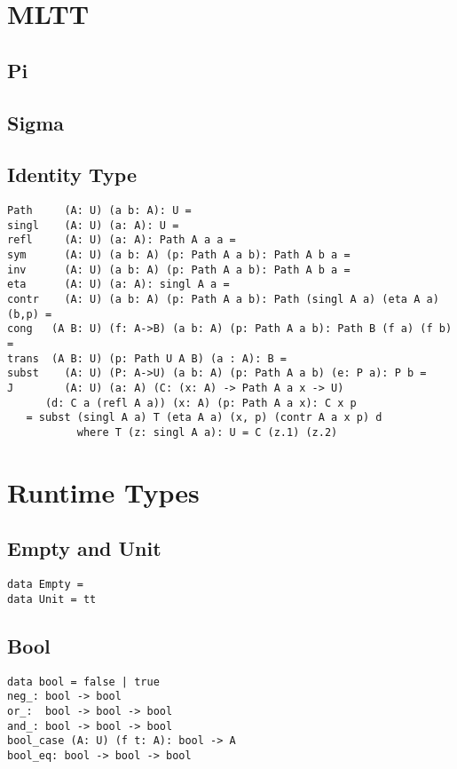 \documentclass{article}
\begin{document}
\section{MLTT}

\subsection{Pi}
\subsection{Sigma}
\subsection{Identity Type}

\begin{lstlisting}[mathescape=true]
Path     (A: U) (a b: A): U =
singl    (A: U) (a: A): U =
refl     (A: U) (a: A): Path A a a =
sym      (A: U) (a b: A) (p: Path A a b): Path A b a =
inv      (A: U) (a b: A) (p: Path A a b): Path A b a =
eta      (A: U) (a: A): singl A a =
contr    (A: U) (a b: A) (p: Path A a b): Path (singl A a) (eta A a) (b,p) =
cong   (A B: U) (f: A->B) (a b: A) (p: Path A a b): Path B (f a) (f b) =
trans  (A B: U) (p: Path U A B) (a : A): B =
subst    (A: U) (P: A->U) (a b: A) (p: Path A a b) (e: P a): P b =
J        (A: U) (a: A) (C: (x: A) -> Path A a x -> U)
      (d: C a (refl A a)) (x: A) (p: Path A a x): C x p
   = subst (singl A a) T (eta A a) (x, p) (contr A a x p) d
           where T (z: singl A a): U = C (z.1) (z.2)
\end{lstlisting}

\newpage
\section{Runtime Types}

\subsection{Empty and Unit}

\begin{lstlisting}[mathescape=true]
data Empty =
data Unit = tt
\end{lstlisting}

\subsection{Bool}

\begin{lstlisting}[mathescape=true]
data bool = false | true
neg_: bool -> bool
or_:  bool -> bool -> bool
and_: bool -> bool -> bool
bool_case (A: U) (f t: A): bool -> A
bool_eq: bool -> bool -> bool
\end{lstlisting}
\end{document}
